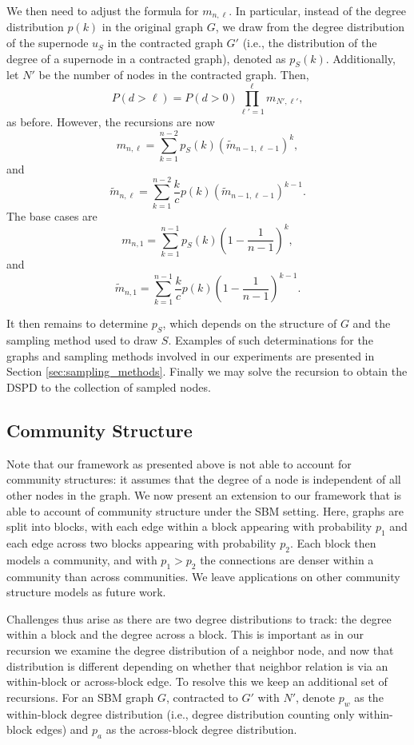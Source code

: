 We then need to adjust the formula for $m_{n,\ell}$. In particular, instead of the degree distribution $p(k)$ in the original graph $G$, we draw from the degree distribution of the supernode $u_S$ in the contracted graph $G'$ (i.e., the distribution of the degree of a supernode in a contracted graph), denoted as $p_S(k)$. Additionally, let $N'$ be the number of nodes in the contracted graph. Then,
\[
P(d > \ell) = P(d > 0) \prod_{\ell'=1}^\ell m_{N', \ell'},
\]
as before. However, the recursions are now
\[
    m_{n, \ell} = \sum_{k=1}^{n-2} p_S(k) (\tilde{m}_{n-1,\ell-1})^k,
\]
and
\[
    \tilde{m}_{n, \ell} = \sum_{k=1}^{n-2} \frac{k}{c} p(k) (\tilde{m}_{n-1, \ell-1})^{k-1}.
\]
The base cases are
\[
    m_{n,1} = \sum_{k=1}^{n-1} p_S(k) \left(1 - \frac{1}{n-1}\right)^k,
\]
and
\[
    \tilde{m}_{n,1} = \sum_{k=1}^{n-1} \frac{k}{c}p(k) \left(1 - \frac{1}{n-1}\right)^{k-1}.
\]

It then remains to determine $p_S$, which depends on the structure of $G$ and the sampling method used to draw $S$. Examples of such determinations for the graphs and sampling methods involved in our experiments are presented in Section \ref{sec:sampling_methods}. Finally we may solve the recursion to obtain the DSPD to the collection of sampled nodes.

\subsection{Community Structure}

Note that our framework as presented above is not able to account for community structures: it assumes that the degree of a node is independent of all other nodes in the graph. We now present an extension to our framework that is able to account of community structure under the SBM setting. Here, graphs are split into blocks, with each edge within a block appearing with probability $p_1$ and each edge across two blocks appearing with probability $p_2$. Each block then models a community, and with $p_1 > p_2$ the connections are denser within a community than across communities. We leave applications on other community structure models as future work.

Challenges thus arise as there are two degree distributions to track: the degree within a block and the degree across a block. This is important as in our recursion we examine the degree distribution of a neighbor node, and now that distribution is different depending on whether that neighbor relation is via an within-block or across-block edge. To resolve this we keep an additional set of recursions. For an SBM graph $G$, contracted to $G'$ with $N'$, denote $p_w$ as the within-block degree distribution (i.e., degree distribution counting only within-block edges) and $p_a$ as the across-block degree distribution.

